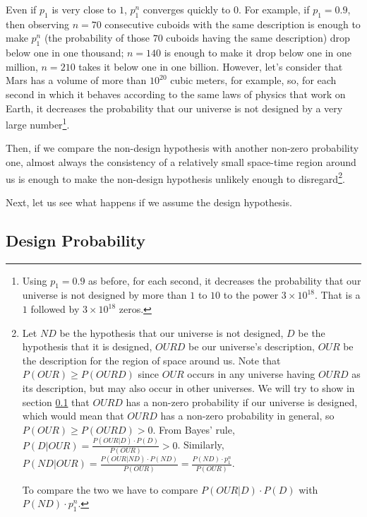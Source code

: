 \documentclass[a4paper
,draft
]{article}
\def\our_description{OURD}
\begin{document}
Even if $p_1$ is very close to $1$, $p_1^n$ converges quickly to $0$.
For example, if $p_1=0.9$, then observing $n=70$ consecutive cuboids with
the same description is enough to make $p_1^n$
(the probability of those $70$ cuboids having the same description)
drop below one in one thousand;
$n=140$ is enough to make it drop below one in one million,
$n=210$ takes it below one in one billion. However, let's consider that
Mars has a volume of more than $10^{20}$ cubic meters, for example, so, for each second
in which it behaves according to the same laws of physics that work on
Earth, it decreases the probability that our universe is not designed by a
very large number\footnote{Using $p_1=0.9$ as before, for each second,
it decreases the
probability that our universe is not designed by more than $1$ to
$10$ to the power $3\times 10^{18}$. That is a $1$ followed by $3\times 10^{18}$ zeros.}.

Then, if we compare the non-design hypothesis
with another non-zero probability one,
almost always the consistency of a relatively small space-time region around us
is enough to make the non-design hypothesis unlikely enough to
disregard\footnote{
  Let $ND$ be the hypothesis that our universe is not designed,
  $D$ be the hypothesis that it is designed, $\our_description$ be our
  universe's description,
  $OUR$ be the description for the region of space around us.
  Note that $P(OUR)\ge P(\our_description)$ since $OUR$ occurs in any
  universe having $\our_description$ as its description, but may also
  occur in other universes.
  We will try to show in section \ref{sec:design-probability}
  that $\our_description$ has a non-zero probability
  if our universe is designed, which would mean that $\our_description$ has a
  non-zero probability in general, so
  $P(OUR) \ge P(\our_description) > 0$.
  From Bayes' rule, $P(D|OUR) = \frac{P(OUR|D)\cdot P(D)}{P(OUR)} > 0$.
  Similarly,
  $P(ND|OUR) = \frac{P(OUR|ND)\cdot P(ND)}{P(OUR)}
    = \frac{P(ND)\cdot p_1^n}{P(OUR)}$.

  To compare the two we have to compare $P(OUR|D)\cdot P(D)$ with
  $P(ND)\cdot p_1^n$.
}.

Next, let us see what happens if we assume the design hypothesis.

\subsection{Design Probability}
\label{sec:design-probability}
\end{document}
